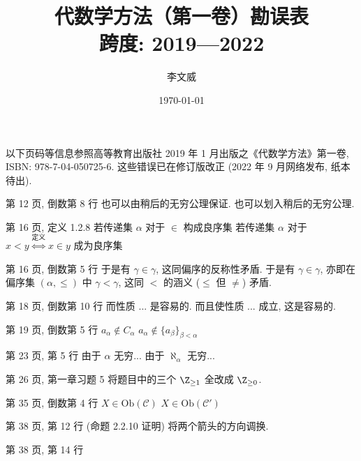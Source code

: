 \documentclass{AJerrata}
\title{\bfseries 代数学方法（第一卷）勘误表 \\ 跨度: 2019---2022 }
\author{李文威}
\date{\today}
\begin{document}
	\maketitle
	以下页码等信息参照高等教育出版社 2019 年 1 月出版之《代数学方法》第一卷, ISBN: 978-7-04-050725-6. 这些错误已在修订版改正 (2022 年 9 月网络发布, 纸本待出).

	\begin{Errata}
		\item[第 12 页, 倒数第 8 行]
		\Orig 也可以由稍后的无穷公理保证.
		\Corr 也可以划入稍后的无穷公理.
		
		\item[第 16 页, 定义 1.2.8]
		\Orig 若传递集 $\alpha$ 对于 $\in$ 构成良序集
		\Corr 若传递集 $\alpha$ 对于 $x < y \stackrel{\text{定义}}{\iff} x \in y$ 成为良序集
		
		\item[第 16 页, 倒数第 5 行]
		\Orig 于是有 $\gamma \in \gamma$, 这同偏序的反称性矛盾.
		\Corr 于是有 $\gamma \in \gamma$, 亦即在偏序集 $(\alpha, \leq)$ 中 $\gamma < \gamma$, 这同 $<$ 的涵义 ($\leq$ 但 $\neq$) 矛盾.
		
		\item[第 18 页, 倒数第 10 行]
		\Orig 而性质 ... 是容易的.
		\Corr 而且使性质 ... 成立, 这是容易的.
		
        \item[第 19 页, 倒数第 5 行]
        \Orig $a_\alpha \notin C_\alpha$
        \Corr $a_\alpha \notin \{ a_\beta \}_{\beta < \alpha}$

		\item[第 23 页, 第 5 行]
		\Orig 由于 $\alpha$ 无穷...
		\Corr 由于 $\aleph_\alpha$ 无穷...

		\item[第 26 页, 第一章习题 5]
		将题目中的三个 $\Z_{\geq 1}$ 全改成 $\Z_{\geq 0}$.

        \item[第 35 页, 倒数第 4 行]
        \Orig $X \in \mathrm{Ob}(\mathcal{C})$
        \Corr $X \in \mathrm{Ob}(\mathcal{C}')$

        \item[第 38 页, 第 12 行 (命题 2.2.10 证明)]
        将两个箭头的方向调换.

		\item[第 38 页, 第 14 行]
		

\end{Errata}
\end{document}
